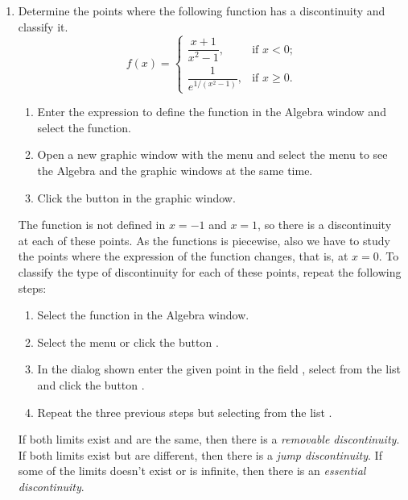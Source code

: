 \begin{enumerate}[leftmargin=*]
\item Determine the points where the following function has a discontinuity and classify it.
\[
f(x)=
\begin{cases}
\dfrac{x+1}{x^2-1}, & \mbox{if $x<0$;} \\
\dfrac{1}{e^{1/(x^2-1)}}, & \mbox{if $x\geq 0$.}
\end{cases}
\]

\begin{indication}
\begin{enumerate}
\item Enter the expression  to define the function in the Algebra window and select the function.
\item Open a new graphic window with the menu  and select the menu  to see the Algebra and the graphic windows at the same time.  
\item Click the button  in the graphic window.
\end{enumerate}
The function is not defined in $x=-1$ and $x=1$, so there is a discontinuity at each of these points. 
As the functions is piecewise, also we have to study the points where the expression of the function changes, that is, at $x=0$.
To classify the type of discontinuity for each of these points, repeat the following steps:
\begin{enumerate}
\item Select the function in the Algebra window.
\item Select the menu  or click the button .
\item In the dialog shown enter the given point in the field , select  from the list  and click the button . 
\item Repeat the three previous steps but selecting  from the list .
\end{enumerate}
If both limits exist and are the same, then there is a \emph{removable discontinuity}. 
If both limits exist but are different, then there is a \emph{jump discontinuity}.
If some of the limits doesn't exist or is infinite, then there is an \emph{essential discontinuity}.  
\end{indication}
\end{enumerate}


